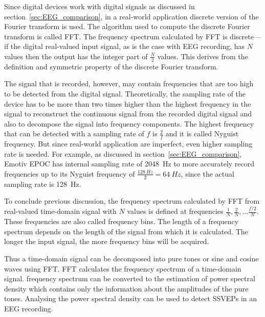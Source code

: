 Since digital devices work with \glspl{digital signal} as discussed in section~\ref{sec:EEG_comparison}, in a real-world application discrete version of the \gls{Fourier transform} is used. The algorithm used to compute the discrete \gls{Fourier transform} is called \gls{FFT}. The \gls{frequency spectrum} calculated by \gls{FFT} is discrete---if the digital real-valued input signal, as is the case with \gls{EEG} recording, has $N$ values then the output has the integer part of $\frac{N}{2}$ values. This derives from the definition and symmetric property of the discrete \gls{Fourier transform}. %

The signal that is recorded, however, may contain frequencies that are too high to be detected from the \gls{digital signal}. Theoretically, the \gls{sampling rate} of the device has to be more than two times higher than the highest frequency in the signal to reconstruct the continuous signal from the recorded \gls{digital signal} and also to decompose the signal into \glspl{frequency component}. The highest frequency that can be detected with a \gls{sampling rate} of $f$ is $\frac{2}{f}$ and it is called \gls{Nyguist frequency}. But since real-world application are imperfect, even higher \gls{sampling rate} is needed. For example, as discussed in section~\ref{sec:EEG_comparison}, Emotiv EPOC has internal \gls{sampling rate} of \SI{2048}{Hz} to more accurately record frequencies up to its \gls{Nyguist frequency} of $\frac{\SI{128}{Hz}}{2}=\SI{64}{Hz}$, since the actual \gls{sampling rate} is \SI{128}{Hz}.

To conclude previous discussion, the \gls{frequency spectrum} calculated by \gls{FFT} from real-valued time-domain signal with $N$ values is defined at frequencies $\frac{1}{N}, \frac{2}{N}, \dots\frac{f/2}{N}$. These frequencies are also called \glspl{frequency bin}. The length of a \gls{frequency spectrum} depends on the length of the signal from which it is calculated. The longer the input signal, the more \glspl{frequency bin} will be acquired.

Thus a time-domain signal can be decomposed into \glspl{pure tone} or sine and cosine waves using \gls{FFT}. \gls{FFT} calculates the \gls{frequency spectrum} of a time-domain signal. \Gls{frequency spectrum} can be converted to the estimation of \gls{power spectral density} which contains only the information about the amplitudes of the \glspl{pure tone}. Analysing the \gls{power spectral density} can be used to detect \glspl{SSVEP} in an \gls{EEG} recording.

